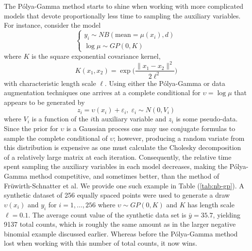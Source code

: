 \documentclass{article}
\newcommand{\ep}{\varepsilon}
\newcommand{\Polya}{P\'{o}lya}
\begin{document}
The \Polya-Gamma method starts to shine when working with more complicated
models that devote proportionally less time to sampling the auxiliary variables.
For instance, consider the model
\[
\begin{cases}
y_i \sim NB(\text{mean} = \mu(x_i), d) \\
\log \mu  \sim GP(0, K)
\end{cases}
\]
where $K$ is the square exponential covariance kernel,
\[
K(x_1,x_2) = \exp \Big( \frac{\|x_1 - x_2\|^2}{2 \ell^2} \Big)
\]
with characteristic length scale $\ell$.  Using either the \Polya-Gamma or
\cite{fruhwirth-schnatter-etal-2009} data augmentation techniques one arrives at
a complete conditional for $\upsilon = \log \mu$ that appears to be generated by
\[
z_i = \upsilon(x_i) + \ep_i, \; \ep_i \sim N(0, V_i)
\]
where $V_i$ is a function of the $i$th auxiliary variable and $z_i$ is some
pseudo-data.  Since the prior for $\upsilon$ is a Gaussian process one may use
conjugate formulas to sample the complete conditional of $\upsilon$; however,
producing a random variate from this distribution is expensive as one must
calculate the Cholesky decomposition of a relatively large matrix at each
iteration.  Consequently, the relative time spent sampling the auxiliary
variables in each model decreases, making the \Polya-Gamma method competitive,
and sometimes better, than the method of Fr\"{u}wirth-Schnatter et al.  We
provide one such example in Table (\ref{tab:nb-gp}).  A synthetic dataset of 256
equally spaced points were used to generate a draw $\upsilon(x_i)$ and $y_i$ for
$i=1, \ldots, 256$ where $\upsilon \sim GP(0, K)$ and $K$ has length scale $\ell
= 0.1$.  The average count value of the synthetic data set is $\bar y = 35.7$,
yielding 9137 total counts, which is roughly the same amount as in the larger
negative binomial example discussed earlier.  Whereas before the \Polya-Gamma
method lost when working with this number of total counts, it now wins.
\end{document}
